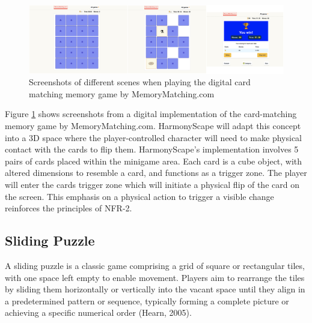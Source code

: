 \documentclass{l4proj}
\begin{document}
\begin{figure}[h]
    \centering
    \includegraphics[width=1.0\linewidth]{dissertation/images/mem_matching.jpg}    

    \caption{Screenshots of different scenes when playing the digital card matching memory game by MemoryMatching.com
    }

    \label{fig:mem_match} 
\end{figure}

Figure \ref{fig:mem_match} shows screenshots from a digital implementation of the card-matching memory game by MemoryMatching.com. HarmonyScape will adapt this concept into a 3D space where the player-controlled character will need to make physical contact with the cards to flip them. HarmonyScape's implementation involves 5 pairs of cards placed within the minigame area. Each card is a cube object, with altered dimensions to resemble a card, and functions as a trigger zone. The player will enter the cards trigger zone which will initiate a physical flip of the card on the screen. This emphasis on a physical action to trigger a visible change reinforces the principles of NFR-2.

\subsection{Sliding Puzzle}
A sliding puzzle is a classic game comprising a grid of square or rectangular tiles, with one space left empty to enable movement. Players aim to rearrange the tiles by sliding them horizontally or vertically into the vacant space until they align in a predetermined pattern or sequence, typically forming a complete picture or achieving a specific numerical order (Hearn, 2005).
\end{document}
